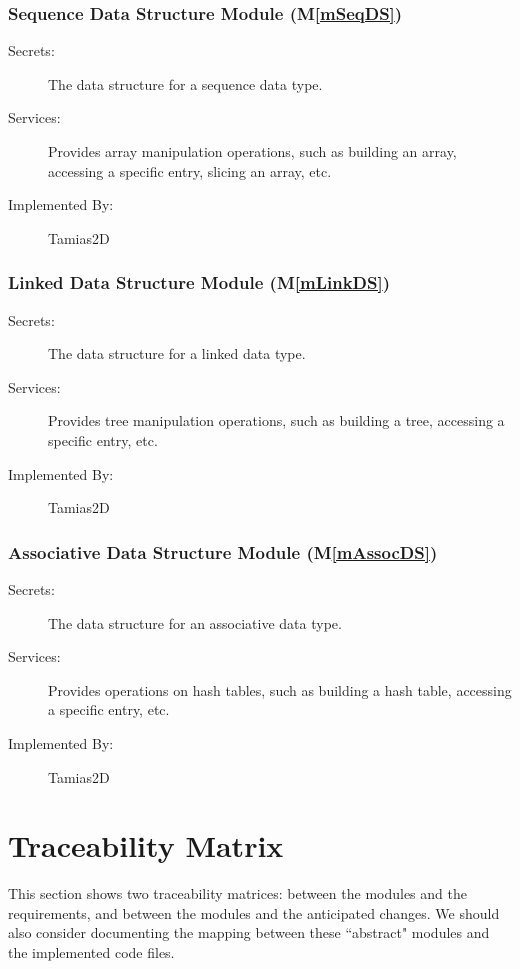 \documentclass[12pt]{article}
\newcommand{\mref}[1]{M\ref{#1}}
\newcommand{\progname}{Tamias2D}
\begin{document}
\subsubsection{Sequence Data Structure Module (\mref{mSeqDS})}

\begin{description}
\item[Secrets:] The data structure for a sequence data type.
\item[Services:] Provides array manipulation operations, such as building an array, accessing a specific entry, slicing an array, etc.
\item[Implemented By:] \progname
\end{description}

\subsubsection{Linked Data Structure Module (\mref{mLinkDS})}

\begin{description}
\item[Secrets:] The data structure for a linked data type.
\item[Services:] Provides tree manipulation operations, such as building a tree, accessing a specific entry, etc.
\item[Implemented By:] \progname
\end{description}

\subsubsection{Associative Data Structure Module (\mref{mAssocDS})}

\begin{description}
\item[Secrets:] The data structure for an associative data type.
\item[Services:] Provides operations on hash tables, such as building a hash table, accessing a specific entry, etc.
\item[Implemented By:] \progname
\end{description}

\section{Traceability Matrix} \label{SecTM}

This section shows two traceability matrices: between the modules and the
requirements, and between the modules and the anticipated changes. We should also consider documenting the mapping between these ``abstract" modules and the implemented code files.
\end{document}
